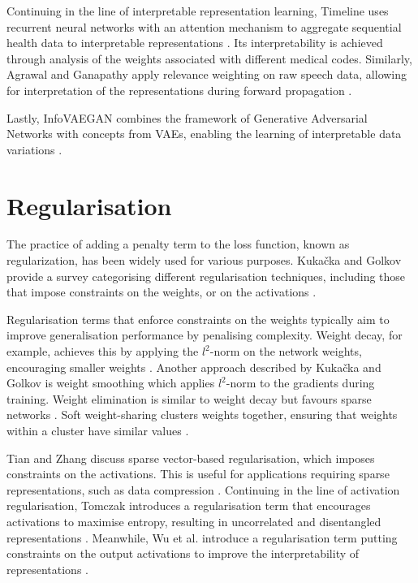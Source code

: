 	Continuing in the line of interpretable representation learning, Timeline uses recurrent neural networks with an attention mechanism to aggregate sequential health data to interpretable representations \cite{baiInterpretableRepresentationLearning2018}. Its interpretability is achieved through analysis of the weights associated with different medical codes. Similarly, Agrawal and Ganapathy apply relevance weighting on raw speech data, allowing for interpretation of the representations during forward propagation \cite{agrawalInterpretableRepresentationLearning2020}. 
	
	Lastly, InfoVAEGAN combines the framework of Generative Adversarial Networks with concepts from VAEs, enabling the learning of interpretable data variations \cite{yeInfoVAEGANLearningJoint2021}.
	
	

\section{Regularisation}
	The practice of adding a penalty term to the loss function, known as regularization, has been widely used for various purposes. Kukačka and Golkov provide a survey categorising different regularisation techniques, including those that impose constraints on the weights, or on the activations \cite{kukackaRegularizationDeepLearning2017}.
	
	Regularisation terms that enforce constraints on the weights typically aim to improve generalisation performance by penalising complexity. Weight decay, for example, achieves this by applying the $l^2$-norm on the network weights, encouraging smaller weights \cite{gneccoWeightdecayTechniqueLearning2009}. Another approach described by Kukačka and Golkov is weight smoothing which applies $l^2$-norm to the gradients during training. Weight elimination is similar to weight decay but favours sparse networks \cite{weigendGeneralizationWeightEliminationApplication1990}. Soft weight-sharing clusters weights together, ensuring that weights within a cluster have similar values \cite{nowlanSimplifyingNeuralNetworks1992}.
	
	Tian and Zhang discuss sparse vector-based regularisation, which imposes constraints on the activations. This is useful for applications requiring sparse representations, such as data compression \cite{tianComprehensiveSurveyRegularization2022}. Continuing in the line of activation regularisation, Tomczak introduces a regularisation term that encourages activations to maximise entropy, resulting in uncorrelated and disentangled representations \cite{tomczakLearningInformativeFeatures2016}. Meanwhile, Wu et al. introduce a regularisation term putting constraints on the output activations to improve the interpretability of representations \cite{wuImprovingInterpretabilityRegularization2018}.


